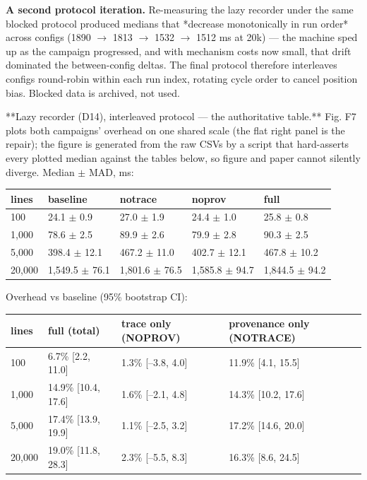 \textbf{A second protocol iteration.} Re-measuring the lazy recorder under
the same blocked protocol produced medians that *decrease
monotonically in run order* across configs (1890 $\rightarrow$ 1813 $\rightarrow$ 1532 $\rightarrow$
1512 ms at 20k) --- the machine sped up as the campaign progressed, and
with mechanism costs now small, that drift dominated the
between-config deltas. The final protocol therefore interleaves
configs round-robin within each run index, rotating cycle order to
cancel position bias. Blocked data is archived, not used.

**Lazy recorder (D14), interleaved protocol --- the authoritative
table.** Fig. F7 plots both campaigns' overhead on one shared scale
(the flat right panel is the repair); the figure is generated from
the raw CSVs by a script that hard-asserts every plotted median
against the tables below, so figure and paper cannot silently
diverge. Median $\pm$ MAD, ms:

\begin{table}[t]
\centering
\small
\begin{tabular}{lllll}
\toprule
lines & baseline & notrace & noprov & full \\
\midrule
100 & 24.1 $\pm$ 0.9 & 27.0 $\pm$ 1.9 & 24.4 $\pm$ 1.0 & 25.8 $\pm$ 0.8 \\
1,000 & 78.6 $\pm$ 2.5 & 89.9 $\pm$ 2.6 & 79.9 $\pm$ 2.8 & 90.3 $\pm$ 2.5 \\
5,000 & 398.4 $\pm$ 12.1 & 467.2 $\pm$ 11.0 & 402.7 $\pm$ 12.1 & 467.8 $\pm$ 10.2 \\
20,000 & 1,549.5 $\pm$ 76.1 & 1,801.6 $\pm$ 76.5 & 1,585.8 $\pm$ 94.7 & 1,844.5 $\pm$ 94.2 \\
\bottomrule
\end{tabular}
\end{table}

Overhead vs baseline (95\% bootstrap CI):

\begin{table}[t]
\centering
\small
\begin{tabular}{llll}
\toprule
lines & full (total) & trace only (NOPROV) & provenance only (NOTRACE) \\
\midrule
100 & 6.7\% [2.2, 11.0] & 1.3\% [--3.8, 4.0] & 11.9\% [4.1, 15.5] \\
1,000 & 14.9\% [10.4, 17.6] & 1.6\% [--2.1, 4.8] & 14.3\% [10.2, 17.6] \\
5,000 & 17.4\% [13.9, 19.9] & 1.1\% [--2.5, 3.2] & 17.2\% [14.6, 20.0] \\
20,000 & 19.0\% [11.8, 28.3] & 2.3\% [--5.5, 8.3] & 16.3\% [8.6, 24.5] \\
\bottomrule
\end{tabular}
\end{table}

